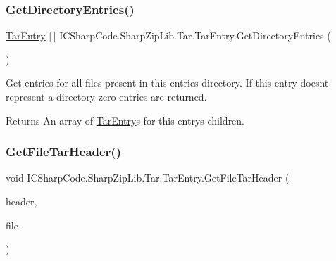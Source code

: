 \subsubsection{\texorpdfstring{Get\+Directory\+Entries()}{GetDirectoryEntries()}}
{\footnotesize\ttfamily \hyperlink{class_i_c_sharp_code_1_1_sharp_zip_lib_1_1_tar_1_1_tar_entry}{Tar\+Entry} \mbox{[}$\,$\mbox{]} I\+C\+Sharp\+Code.\+Sharp\+Zip\+Lib.\+Tar.\+Tar\+Entry.\+Get\+Directory\+Entries (\begin{DoxyParamCaption}{ }\end{DoxyParamCaption})\hspace{0.3cm}{\ttfamily [inline]}}



Get entries for all files present in this entries directory. If this entry doesnt represent a directory zero entries are returned. 

\begin{DoxyReturn}{Returns}
An array of \hyperlink{class_i_c_sharp_code_1_1_sharp_zip_lib_1_1_tar_1_1_tar_entry}{Tar\+Entry}\textquotesingle{}s for this entry\textquotesingle{}s children. 
\end{DoxyReturn}
\mbox{\label{class_i_c_sharp_code_1_1_sharp_zip_lib_1_1_tar_1_1_tar_entry_adedc3f6f9db85bb537943eedbd32a660}} 
\subsubsection{\texorpdfstring{Get\+File\+Tar\+Header()}{GetFileTarHeader()}}
{\footnotesize\ttfamily void I\+C\+Sharp\+Code.\+Sharp\+Zip\+Lib.\+Tar.\+Tar\+Entry.\+Get\+File\+Tar\+Header (\begin{DoxyParamCaption}\item[{\hyperlink{class_i_c_sharp_code_1_1_sharp_zip_lib_1_1_tar_1_1_tar_header}{Tar\+Header}}]{header,  }\item[{string}]{file }\end{DoxyParamCaption})\hspace{0.3cm}{\ttfamily [inline]}}



